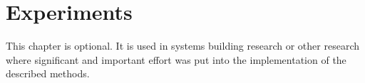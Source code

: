 \chapter{Experiments}
\label{ch:Experiments}

This chapter is optional.
It is used in systems building research or other research
where significant and important effort was put into the
implementation of the described methods.
